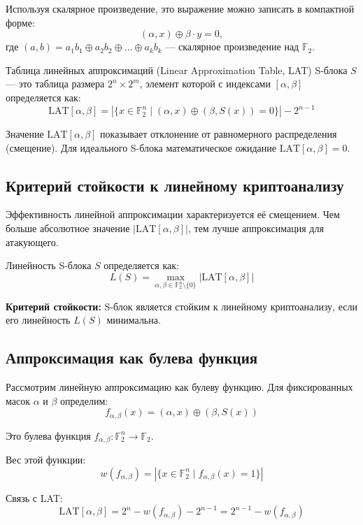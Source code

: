 Используя скалярное произведение, это выражение можно записать в компактной форме:
\[
    (\alpha, x) \oplus \beta \cdot y = 0,
\]
где $(a,b) = a_1b_1 \oplus a_2b_2 \oplus \dots \oplus a_kb_k$ — скалярное произведение над $\mathbb{F}_2$.

\begin{definition}
Таблица линейных аппроксимаций (Linear Approximation Table, LAT) S-блока $S$ — это таблица размера $2^n \times 2^m$, элемент которой с индексами $[\alpha, \beta]$ определяется как:
\[
    \text{LAT}[\alpha, \beta] = |\{x \in \mathbb{F}_2^n \mid (\alpha, x) \oplus (\beta, S(x)) = 0\}| - 2^{n-1}
\]
\end{definition}

Значение $\text{LAT}[\alpha, \beta]$ показывает отклонение от равномерного распределения (смещение). Для идеального S-блока математическое ожидание $\text{LAT}[\alpha, \beta] = 0$.
\subsection{Критерий стойкости к линейному криптоанализу}

Эффективность линейной аппроксимации характеризуется её смещением. Чем больше абсолютное значение $|\text{LAT}[\alpha, \beta]|$, тем лучше аппроксимация для атакующего.

\begin{definition}
Линейность S-блока $S$ определяется как:
\[
    L(S) = \max_{\alpha, \beta \in \mathbb{F}_2^n \setminus \{0\}} |\text{LAT}[\alpha, \beta]|
\]
\end{definition}

\textbf{Критерий стойкости:} S-блок является стойким к линейному криптоанализу, если его линейность $L(S)$ минимальна.

\subsection{Аппроксимация как булева функция}

Рассмотрим линейную аппроксимацию как булеву функцию. Для фиксированных масок $\alpha$ и $\beta$ определим:
\[
    f_{\alpha,\beta}(x) =  (\alpha, x)  \oplus (\beta, S(x)) 
\]

Это булева функция $f_{\alpha,\beta} : \mathbb{F}_2^n \to \mathbb{F}_2$. 

Вес этой функции:
\[
    w(f_{\alpha,\beta}) = |\{x \in \mathbb{F}_2^n \mid f_{\alpha,\beta}(x) = 1\}|
\]

Связь с LAT:
\[
    \text{LAT}[\alpha, \beta] = 2^n - w(f_{\alpha, \beta}) - 2^{n-1} =2^{n-1} - w(f_{\alpha,\beta})
\]

